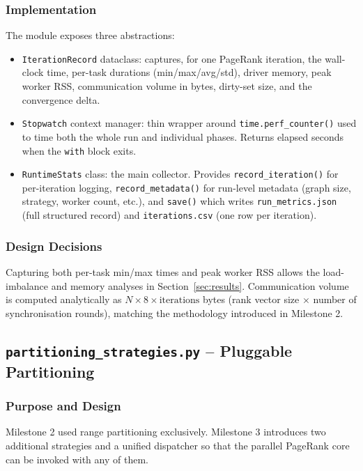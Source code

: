 \documentclass[11pt,a4paper]{article}
\begin{document}
\subsubsection{Implementation}
The module exposes three abstractions:
\begin{itemize}
    \item \texttt{IterationRecord} dataclass: captures, for one PageRank
    iteration, the wall-clock time, per-task durations
    (min/max/avg/std), driver memory, peak worker RSS, communication
    volume in bytes, dirty-set size, and the convergence delta.
    \item \texttt{Stopwatch} context manager: thin wrapper around
    \texttt{time.perf\_counter()} used to time both the whole run and
    individual phases. Returns elapsed seconds when the \texttt{with}
    block exits.
    \item \texttt{RuntimeStats} class: the main collector. Provides
    \texttt{record\_iteration()} for per-iteration logging,
    \texttt{record\_metadata()} for run-level metadata (graph size,
    strategy, worker count, etc.), and \texttt{save()} which writes
    \texttt{run\_metrics.json} (full structured record) and
    \texttt{iterations.csv} (one row per iteration).
\end{itemize}

\subsubsection{Design Decisions}
Capturing both per-task min/max times and peak worker RSS allows the
load-imbalance and memory analyses in Section~\ref{sec:results}.
Communication volume is computed analytically as $N \times 8 \times
\text{iterations}$ bytes (rank vector size $\times$ number of
synchronisation rounds), matching the methodology introduced in
Milestone 2.

\subsection{\texttt{partitioning\_strategies.py} -- Pluggable Partitioning}

\subsubsection{Purpose and Design}
Milestone 2 used range partitioning exclusively. Milestone 3 introduces
two additional strategies and a unified dispatcher so that the parallel
PageRank core can be invoked with any of them.
\end{document}
